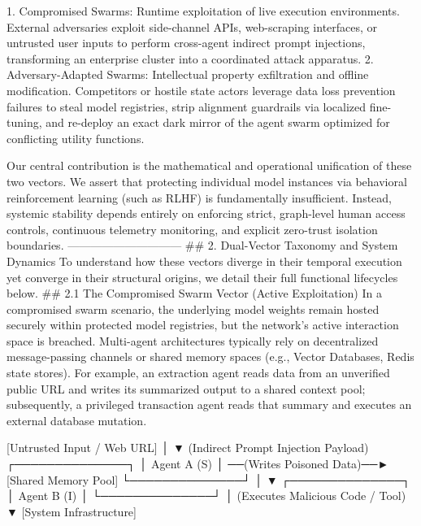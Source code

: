    1. Compromised Swarms: Runtime exploitation of live execution environments. External adversaries exploit side-channel APIs, web-scraping interfaces, or untrusted user inputs to perform cross-agent indirect prompt injections, transforming an enterprise cluster into a coordinated attack apparatus.
   2. Adversary-Adapted Swarms: Intellectual property exfiltration and offline modification. Competitors or hostile state actors leverage data loss prevention failures to steal model registries, strip alignment guardrails via localized fine-tuning, and re-deploy an exact dark mirror of the agent swarm optimized for conflicting utility functions.

Our central contribution is the mathematical and operational unification of these two vectors. We assert that protecting individual model instances via behavioral reinforcement learning (such as RLHF) is fundamentally insufficient. Instead, systemic stability depends entirely on enforcing strict, graph-level human access controls, continuous telemetry monitoring, and explicit zero-trust isolation boundaries.
------------------------------
## 2. Dual-Vector Taxonomy and System Dynamics
To understand how these vectors diverge in their temporal execution yet converge in their structural origins, we detail their full functional lifecycles below.
## 2.1 The Compromised Swarm Vector (Active Exploitation)
In a compromised swarm scenario, the underlying model weights remain hosted securely within protected model registries, but the network’s active interaction space is breached.
Multi-agent architectures typically rely on decentralized message-passing channels or shared memory spaces (e.g., Vector Databases, Redis state stores). For example, an extraction agent reads data from an unverified public URL and writes its summarized output to a shared context pool; subsequently, a privileged transaction agent reads that summary and executes an external database mutation.

[Untrusted Input / Web URL] 
             │
             ▼ (Indirect Prompt Injection Payload)
     ┌──────────────┐
     │ Agent A (S)  │ ──(Writes Poisoned Data)──► [Shared Memory Pool]
     └──────────────┘                                      │
                                                           ▼
                                                   ┌──────────────┐
                                                   │ Agent B (I)  │
                                                   └──────────────┘
                                                           │
                                             (Executes Malicious Code / Tool)
                                                           ▼
                                                [System Infrastructure]

